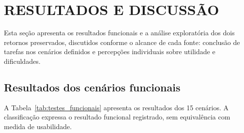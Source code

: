 \documentclass{UNESC}
\begin{document}
\section{RESULTADOS E DISCUSSÃO}

Esta seção apresenta os resultados funcionais e a análise exploratória dos dois retornos preservados, discutidos conforme o alcance de cada fonte: conclusão de tarefas nos cenários definidos e percepções individuais sobre utilidade e dificuldades.

\subsection{Resultados dos cenários funcionais}

A Tabela~\ref{tab:testes_funcionais} apresenta os resultados dos 15 cenários. A classificação expressa o resultado funcional registrado, sem equivalência com medida de usabilidade.
\end{document}
